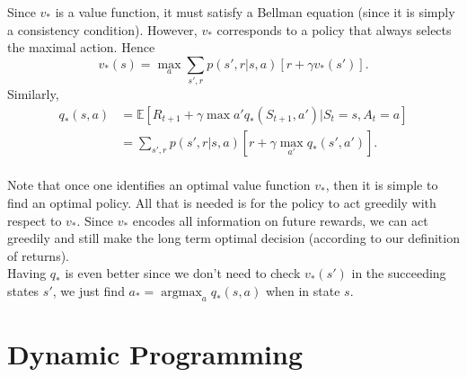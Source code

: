 \documentclass[a4paper, oneside, 11pt]{article}
\newcommand\argmax{\operatorname*{argmax}}
\begin{document}
Since $v_*$ is a value function, it must satisfy a Bellman equation (since it is simply a consistency condition). However, $v_*$ corresponds to a policy that always selects the maximal action. Hence 
\begin{equation}
    v_*(s) = \max_a \sum_{s', r} p(s', r|s, a) [r + \gamma v_*(s')].
\end{equation}
Similarly,
\begin{align}
    q_*(s, a) &= \mathbb{E} [R_{t+1} + \gamma \max{a'}q_*(S_{t+1}, a') | S_t=s, A_t = a]\\
              &= \sum_{s', r} p(s', r| s, a ) [r + \gamma \max_{a'}q_*(s', a')].
\end{align} \\

Note that once one identifies an optimal value function $v_*$, then it is simple to find an optimal policy. All that is needed is for the policy to act greedily with respect to $v_*$. Since $v_*$ encodes all information on future rewards, we can act greedily and still make the long term optimal decision (according to our definition of returns).\\

Having $q_*$ is even better since we don't need to check $v_*(s')$ in the succeeding states $s'$, we just find $a_* = \argmax_a q_*(s, a)$ when in state $s$.


\section{Dynamic Programming}


\end{document}
